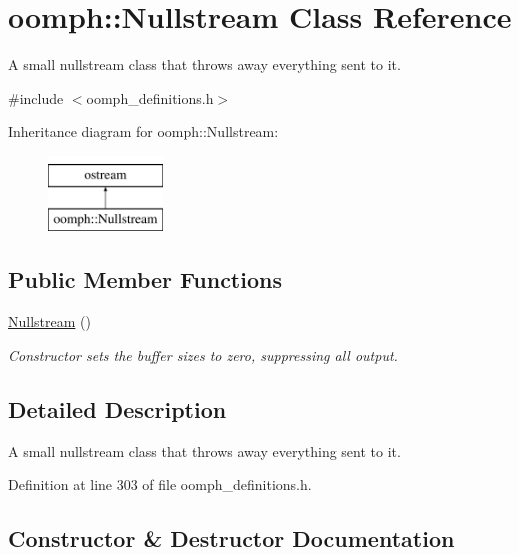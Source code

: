 \hypertarget{classoomph_1_1Nullstream}{}\section{oomph\+:\+:Nullstream Class Reference}
\label{classoomph_1_1Nullstream}


A small nullstream class that throws away everything sent to it.  




{\ttfamily \#include $<$oomph\+\_\+definitions.\+h$>$}

Inheritance diagram for oomph\+:\+:Nullstream\+:\begin{figure}[H]
\begin{center}
\leavevmode
\includegraphics[height=2.000000cm]{classoomph_1_1Nullstream}
\end{center}
\end{figure}
\subsection*{Public Member Functions}
\begin{DoxyCompactItemize}
\item 
\hyperlink{classoomph_1_1Nullstream_a2ec7805e35f6942a262bace56b1a5e77}{Nullstream} ()
\begin{DoxyCompactList}\small\item\em Constructor sets the buffer sizes to zero, suppressing all output. \end{DoxyCompactList}\end{DoxyCompactItemize}


\subsection{Detailed Description}
A small nullstream class that throws away everything sent to it. 

Definition at line 303 of file oomph\+\_\+definitions.\+h.



\subsection{Constructor \& Destructor Documentation}
\mbox{\label{classoomph_1_1Nullstream_a2ec7805e35f6942a262bace56b1a5e77}} 
